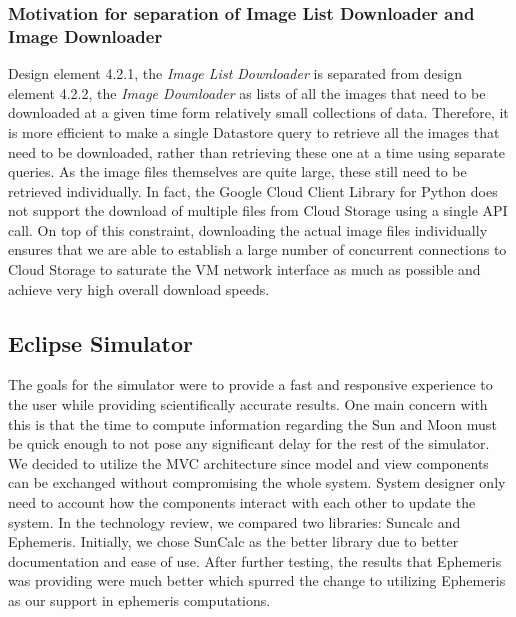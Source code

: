 \documentclass[10pt, onecolumn, draftclsnofoot, letterpaper, compsoc]{IEEEtran}
\begin{document}
    \subsubsection{Motivation for separation of Image List Downloader and Image Downloader}
    Design element 4.2.1, the \textit{Image List Downloader} is separated from design element 4.2.2, the 
    \textit{Image Downloader} as lists of all the images that need to be downloaded at a given time form 
    relatively small collections of data. Therefore, it is more efficient to make a single Datastore query to 
    retrieve all the images that need to be downloaded, rather than retrieving these one at a time using 
    separate queries. As the image files themselves are quite large, these still need to be retrieved 
    individually. In fact, the Google Cloud Client Library for Python does not support the download of multiple 
    files from Cloud Storage using a single API call. On top of this constraint, downloading the actual image 
    files individually ensures that we are able to establish a large number of concurrent connections to Cloud 
    Storage to saturate the VM network interface as much as possible and achieve very high overall download 
    speeds. \\

\subsection{Eclipse Simulator}


The goals for the simulator were to provide a fast and
responsive experience to the user while providing
scientifically accurate results. One main concern with this
is that the time to compute information regarding the Sun
and Moon must be quick enough to not pose any significant
delay for the rest of the simulator. \\

We decided to utilize the MVC architecture since model and
view components can be exchanged without compromising the
whole system. System designer only need to account how the
components interact with each other to update the system.
In the technology review, we compared two libraries: Suncalc
and Ephemeris. Initially, we chose SunCalc as the better
library due to better documentation and ease of use. After
further testing, the results that Ephemeris was providing
were much better which spurred the change to utilizing
Ephemeris as our support in ephemeris computations. \\
\end{document}
